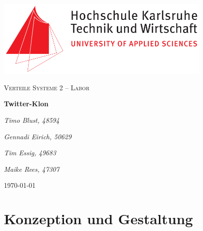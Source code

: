 \documentclass[
    a4paper
]{scrreprt}
\begin{document}
    \sffamily %


    \begin{titlepage}
        \centering
        \includegraphics[width=0.8\textwidth]{./images/logo_hska.png}\par\vspace{1cm}
        \vspace{1cm}

        {\scshape\Large Verteile Systeme 2 -- Labor\par}
        \vspace{1.5cm}

        {\huge\textbf{Twitter-Klon}\par}
        \vspace{2cm}

        {\Large\itshape Timo Blust, 48594\par}
        {\Large\itshape Gennadi Eirich, 50629\par}
        {\Large\itshape Tim Essig, 49683\par}
        {\Large\itshape Maike Rees, 47307\par}
        
        \vfill

        {\large \today\par}
    \end{titlepage}


    \tableofcontents


    \chapter{Konzeption und Gestaltung}
\end{document}
